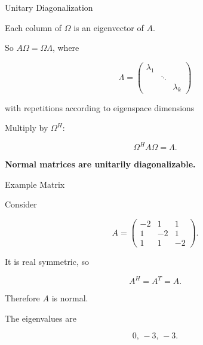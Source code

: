 \documentclass[10pt]{beamer}
\theoremstyle{definition}
\newcommand{\x}[1]{\alert{\textbf{#1}}}
\begin{document}
\begin{frame}{Unitary Diagonalization}

Each column of $\Omega$ is an eigenvector of $A$.

\vfill

So $A\Omega=\Omega\Lambda$, where

$$
\Lambda=
\begin{pmatrix}
\lambda_1\\
&\ddots\\
&&\lambda_k
\end{pmatrix}
$$

\vspace{-2mm}
\begin{center}
{\small with repetitions according to eigenspace dimensions}
\end{center}

\vfill\pause

Multiply by $\Omega^H$:

$$
\boxed{
\Omega^HA\Omega=\Lambda.
}
$$

\vfill

\x{Normal matrices are unitarily diagonalizable.}

\end{frame}


\begin{frame}{Example Matrix}

Consider

$$
A=
\begin{pmatrix}
-2&1&1\\
1&-2&1\\
1&1&-2
\end{pmatrix}.
$$

\vfill\pause

It is real symmetric, so

$$
A^H=A^T=A.
$$

\vfill

Therefore $A$ is normal.

\vfill\pause

The eigenvalues are

$$
0,\,-3,\,-3.
$$

\end{frame}
\end{document}
